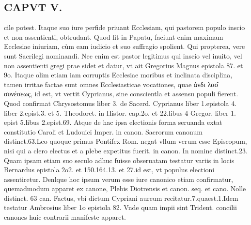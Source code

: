 \documentclass{article}
\begin{document}
\begin{pages}
\section*{CAPVT V. }
\marginpar{[ p.35  ]}\pstart cile potest. Itaque suo iure perfide priuant Ecclesiam, qui pastorem populo inscio et non assentienti, obtrudant. Quod fit in Papatu, faciunt enim maximam Ecclesiae iniuriam, cùm eam iudicio et suo suffragio spolient. Qui propterea, vere sunt Sacrilegi nominandi. Nec enim est pastor legitimus qui inscio vel inuito, vel non assentienti gregi prae sidet et datur, vt ait Gregorius Magnus epistola 87. et 9o. Itaque olim etiam iam corruptis Ecclesiae moribus et inclinata disciplina, tamen irritae factae sunt omnes Ecclesiasticae vocationes, quae ἀνδι λαο͂ συνέσεως, id est, vt vertit Cyprianus, sine conscientla et assensu populi fierent. Quod confirmat Chrysostomus liber 3. de Sacerd. Cyprianus liber 1.epistola 4. liber 2.epist.3. et 5. Theodoret. in Histor. cap.2o. et 22.libus 4 Gregor. liber 1. epist 5.libus 2.epist.69. Atque de hac ipsa electionis forma seruanda extat constitutio Caroli et Ludouici Imper. in canon. Sacrorum canonum distinct.63.Leo quoque primus Pontifex Rom. negat vllum verum esse Episcopum, nisi qui a clero electus et a plebe expetitus fuerit. in canon. In nomine distinct.23. Quam ipsam etiam suo seculo adhuc fuisse obseruatam testatur variis in locis Bernardus epistola 2o2. et 150.164.13. et 27.id est, vt populus electioni assentiretur. Denlque hoc ipsum verum esse iure canonico etiam confirmatur, quemadmodum apparet ex canone, Plebis Diotrensis et canon. seq. et cano. Nolle distinct. 63 can. Factus, vbi dictum Cypriani aureum recitatur.7.quaest.1.Idem testatur Ambrosius liber 1o epistola 82. Vnde quam impii sint Trident. concilii canones huic contrarii manifeste apparet.  \pend

\end{pages}
\end{document}
